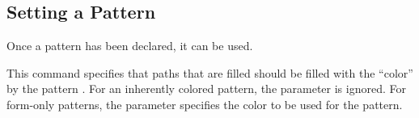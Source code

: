 \subsection{Setting a Pattern}

Once a pattern has been declared, it can be used.

\begin{command}{\pgfsetfillpattern{}}
    This command specifies that paths that are filled should be filled with the
    ``color'' by the pattern . For an inherently colored pattern,
    the  parameter is ignored. For form-only patterns, the
     parameter specifies the color to be used for the pattern.
\begin{codeexample}[]
\end{codeexample}
\end{command}


